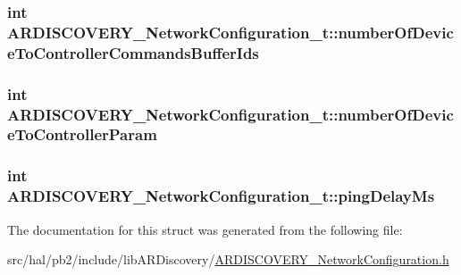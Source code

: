 \subsubsection[{\texorpdfstring{number\+Of\+Device\+To\+Controller\+Commands\+Buffer\+Ids}{numberOfDeviceToControllerCommandsBufferIds}}]{\setlength{\rightskip}{0pt plus 5cm}int A\+R\+D\+I\+S\+C\+O\+V\+E\+R\+Y\+\_\+\+Network\+Configuration\+\_\+t\+::number\+Of\+Device\+To\+Controller\+Commands\+Buffer\+Ids}\hypertarget{struct_a_r_d_i_s_c_o_v_e_r_y___network_configuration__t_a44c23601ba0c042620618b2039cabf1c}{}\label{struct_a_r_d_i_s_c_o_v_e_r_y___network_configuration__t_a44c23601ba0c042620618b2039cabf1c}
\subsubsection[{\texorpdfstring{number\+Of\+Device\+To\+Controller\+Param}{numberOfDeviceToControllerParam}}]{\setlength{\rightskip}{0pt plus 5cm}int A\+R\+D\+I\+S\+C\+O\+V\+E\+R\+Y\+\_\+\+Network\+Configuration\+\_\+t\+::number\+Of\+Device\+To\+Controller\+Param}\hypertarget{struct_a_r_d_i_s_c_o_v_e_r_y___network_configuration__t_a4bbfe88e4c245e0a44cb1f06733042c1}{}\label{struct_a_r_d_i_s_c_o_v_e_r_y___network_configuration__t_a4bbfe88e4c245e0a44cb1f06733042c1}
\subsubsection[{\texorpdfstring{ping\+Delay\+Ms}{pingDelayMs}}]{\setlength{\rightskip}{0pt plus 5cm}int A\+R\+D\+I\+S\+C\+O\+V\+E\+R\+Y\+\_\+\+Network\+Configuration\+\_\+t\+::ping\+Delay\+Ms}\hypertarget{struct_a_r_d_i_s_c_o_v_e_r_y___network_configuration__t_adc6b8e75aaa14ddf7fd47a0953eb116a}{}\label{struct_a_r_d_i_s_c_o_v_e_r_y___network_configuration__t_adc6b8e75aaa14ddf7fd47a0953eb116a}


The documentation for this struct was generated from the following file\+:\begin{DoxyCompactItemize}
\item 
src/hal/pb2/include/lib\+A\+R\+Discovery/\hyperlink{_a_r_d_i_s_c_o_v_e_r_y___network_configuration_8h}{A\+R\+D\+I\+S\+C\+O\+V\+E\+R\+Y\+\_\+\+Network\+Configuration.\+h}\end{DoxyCompactItemize}
